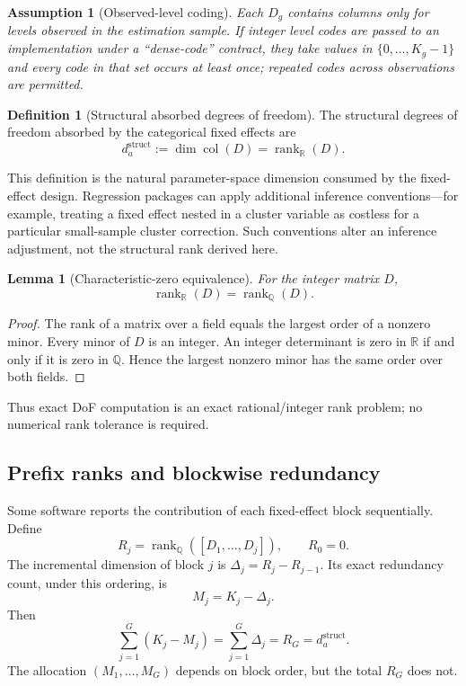 \documentclass[11pt]{article}
\newtheorem{lemma}[theorem]{Lemma}
\newtheorem{assumption}[theorem]{Assumption}
\theoremstyle{definition}
\newtheorem{definition}[theorem]{Definition}
\newcommand{\R}{\mathbb{R}}
\newcommand{\Q}{\mathbb{Q}}
\newcommand{\rank}{\operatorname{rank}}
\newcommand{\col}{\operatorname{col}}
\newcommand{\1}{\mathbf{1}}
\begin{document}
\begin{assumption}[Observed-level coding]\label{ass:observed}
Each $D_g$ contains columns only for levels observed in the estimation sample. If integer level codes are passed to an implementation under a ``dense-code'' contract, they take values in $\{0,\ldots,K_g-1\}$ and every code in that set occurs at least once; repeated codes across observations are permitted.
\end{assumption}

\begin{definition}[Structural absorbed degrees of freedom]
The structural degrees of freedom absorbed by the categorical fixed effects are
\begin{equation}
  d_a^{\mathrm{struct}} := \dim\col(D)=\rank_{\R}(D).
\end{equation}
\end{definition}

This definition is the natural parameter-space dimension consumed by the fixed-effect design. Regression packages can apply additional inference conventions---for example, treating a fixed effect nested in a cluster variable as costless for a particular small-sample cluster correction. Such conventions alter an inference adjustment, not the structural rank derived here.

\begin{lemma}[Characteristic-zero equivalence]\label{lem:RQ}
For the integer matrix $D$,
\begin{equation}
  \rank_{\R}(D)=\rank_{\Q}(D).
\end{equation}
\end{lemma}

\begin{proof}
The rank of a matrix over a field equals the largest order of a nonzero minor. Every minor of $D$ is an integer. An integer determinant is zero in $\R$ if and only if it is zero in $\Q$. Hence the largest nonzero minor has the same order over both fields.
\end{proof}

Thus exact DoF computation is an exact rational/integer rank problem; no numerical rank tolerance is required.

\subsection{Prefix ranks and blockwise redundancy}

Some software reports the contribution of each fixed-effect block sequentially. Define
\begin{equation}
  R_j = \rank_{\Q}([D_1,\ldots,D_j]), \qquad R_0=0.
\end{equation}
The incremental dimension of block $j$ is $\Delta_j=R_j-R_{j-1}$. Its exact redundancy count, under this ordering, is
\begin{equation}
  M_j = K_j-\Delta_j.
  \label{eq:Mj}
\end{equation}
Then
\begin{equation}
  \sum_{j=1}^{G}(K_j-M_j)=\sum_{j=1}^{G}\Delta_j=R_G=d_a^{\mathrm{struct}}.
\end{equation}
The allocation $(M_1,\ldots,M_G)$ depends on block order, but the total $R_G$ does not.
\end{document}

